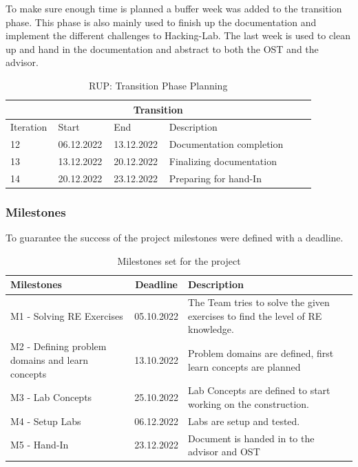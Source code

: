 \noindent To make sure enough time is planned a buffer week was added to the transition phase. This phase is also mainly used to finish up the documentation and implement the different challenges to Hacking-Lab. The last week is used to clean up and hand in the documentation and abstract to both the OST and the advisor.
\begin{table}[H]
    \centering
    \begin{tabular}{|p{0.12\linewidth}|p{0.15\linewidth}|p{0.15\linewidth}|p{0.46\linewidth}|}
        \hline
        \multicolumn{4}{||c||}{\textbf{Transition}} \\
        \hline \hline
        Iteration & Start & End & Description \\
        \hline \hline
        12 & 06.12.2022 & 13.12.2022 & Documentation completion \\
        \hline
        13 & 13.12.2022 & 20.12.2022 & Finalizing documentation \\
        \hline
        14 & 20.12.2022 & 23.12.2022 & Preparing for hand-In \\
        \hline
    \end{tabular}
    \caption{RUP: Transition Phase Planning}
    \label{transition_table}
\end{table}

\subsubsection*{Milestones}
To guarantee the success of the project milestones were defined with a deadline.

\begin{table}[H]
    \centering
    \begin{tabular}[]{|| p{5cm} | c | p{6.2cm} ||}
        \hline
        Milestones & Deadline & Description \\
        \hline \hline
        M1 - Solving RE Exercises & 05.10.2022 & The Team tries to solve the given exercises to find the level of RE knowledge. \\
        \hline
        M2 - Defining problem domains and learn concepts& 13.10.2022 & Problem domains are defined, first learn concepts are planned \\
        \hline
        M3 - Lab Concepts & 25.10.2022 & Lab Concepts are defined to start working on the construction. \\
        \hline
        M4 - Setup Labs & 06.12.2022 & Labs are setup and tested. \\
        \hline
        M5 - Hand-In & 23.12.2022 & Document is handed in to the advisor and OST \\
        \hline
    \end{tabular}
    \caption{Milestones set for the project}
    \label{milestones_table}
\end{table}

